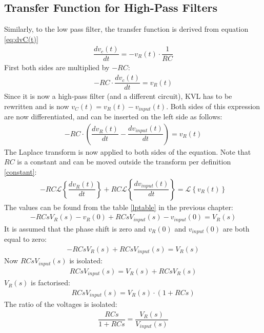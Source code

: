 \subsection{Transfer Function for High-Pass Filters}
Similarly, to the low pass filter, the transfer function is derived from equation \eqref{eq:dvC(t)} 
\begin{align}
\dfrac{dv_{c}(t)}{dt} = -v_{R}(t) \cdot \dfrac{1}{RC}
\end{align}
First both sides are multiplied by $-RC$:
\begin{align}
-RC \cdot \dfrac{dv_{c}(t)}{dt} = v_{R}(t)
\end{align}
Since it is now a high-pass filter (and a different circuit), KVL has to be rewritten and is now $v_{C}(t)=v_{R}(t)-v_{input}(t)$. Both sides of this expression are now differentiated, and can be inserted on the left side as follows:
\begin{align*}
-RC \cdot \left(\dfrac{dv_{R}(t)}{dt} - \dfrac{dv_{input}(t)}{dt} \right) = v_{R}(t)
\end{align*}
The Laplace transform is now applied to both sides of the equation. Note that $RC$ is a constant and can be moved outside the transform per definition \ref{constant}:
\begin{align*}
-RC \mathcal{L} \left\{\dfrac{dv_{R}(t)}{dt} \right\} + RC \mathcal{L} \left\{ \dfrac{dv_{input}(t)}{dt} \right\} = \mathcal{L} \left\{v_{R}(t) \right\}
\end{align*}
The values can be found from the table \ref{lptable} in the previous chapter:
\begin{align*}
-RCsV_{R}(s)-v_{R}(0) + RCsV_{input}(s)-v_{input}(0) = V_{R}(s)
\end{align*}
It is assumed that the phase shift is zero and $v_{R}(0)$ and $v_{input}(0)$ are both equal to zero:
\begin{align*}
-RCsV_{R}(s) + RCsV_{input}(s) = V_{R}(s)
\end{align*}
Now $RCs V_{input}(s)$ is isolated:
\begin{align*}
RCsV_{input}(s) = V_{R}(s) + RCsV_{R}(s)
\end{align*}
$V_{R}(s)$ is factorised:
\begin{align*}
RCsV_{input}(s) = V_{R}(s) \cdot (1 + RCs)
\end{align*}
The ratio of the voltages is isolated:
\begin{align} \label{hp:visolated}
\dfrac{RCs}{1 + RCs} = \dfrac{V_{R}(s)}{V_{input}(s)}
\end{align}
